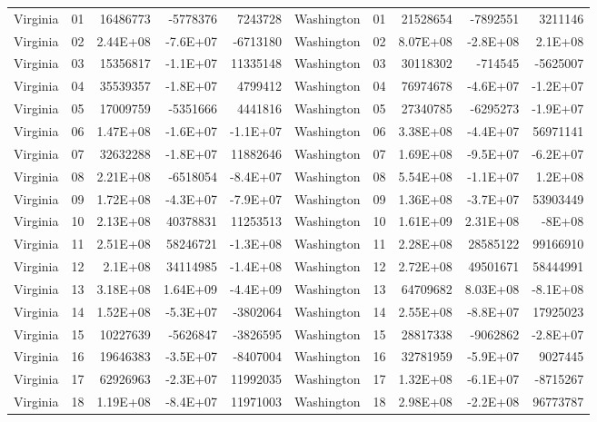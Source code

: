 \begin{landscape}
\begin{singlespace}
\begin{longtable}{lrrrr|lrrrr}
		Virginia &  01  & 16486773 & -5778376 & 7243728 & Washington &  01  & 21528654 & -7892551 & 3211146 \\
		Virginia &  02  & 2.44E+08 & -7.6E+07 & -6713180 & Washington &  02  & 8.07E+08 & -2.8E+08 & 2.1E+08 \\
		Virginia &  03  & 15356817 & -1.1E+07 & 11335148 & Washington &  03  & 30118302 & -714545 & -5625007 \\
		Virginia &  04  & 35539357 & -1.8E+07 & 4799412 & Washington &  04  & 76974678 & -4.6E+07 & -1.2E+07 \\
		Virginia &  05  & 17009759 & -5351666 & 4441816 & Washington &  05  & 27340785 & -6295273 & -1.9E+07 \\
		Virginia &  06  & 1.47E+08 & -1.6E+07 & -1.1E+07 & Washington &  06  & 3.38E+08 & -4.4E+07 & 56971141 \\
		Virginia &  07  & 32632288 & -1.8E+07 & 11882646 & Washington &  07  & 1.69E+08 & -9.5E+07 & -6.2E+07 \\
		Virginia &  08  & 2.21E+08 & -6518054 & -8.4E+07 & Washington &  08  & 5.54E+08 & -1.1E+07 & 1.2E+08 \\
		Virginia &  09  & 1.72E+08 & -4.3E+07 & -7.9E+07 & Washington &  09  & 1.36E+08 & -3.7E+07 & 53903449 \\
		Virginia &  10 & 2.13E+08 & 40378831 & 11253513 & Washington &  10 & 1.61E+09 & 2.31E+08 & -8E+08 \\
		Virginia &  11 & 2.51E+08 & 58246721 & -1.3E+08 & Washington &  11 & 2.28E+08 & 28585122 & 99166910 \\
		Virginia &  12 & 2.1E+08 & 34114985 & -1.4E+08 & Washington &  12 & 2.72E+08 & 49501671 & 58444991 \\
		Virginia &  13 & 3.18E+08 & 1.64E+09 & -4.4E+09 & Washington &  13 & 64709682 & 8.03E+08 & -8.1E+08 \\
		Virginia &  14 & 1.52E+08 & -5.3E+07 & -3802064 & Washington &  14 & 2.55E+08 & -8.8E+07 & 17925023 \\
		Virginia &  15 & 10227639 & -5626847 & -3826595 & Washington &  15 & 28817338 & -9062862 & -2.8E+07 \\
		Virginia &  16 & 19646383 & -3.5E+07 & -8407004 & Washington &  16 & 32781959 & -5.9E+07 & 9027445 \\
		Virginia &  17 & 62926963 & -2.3E+07 & 11992035 & Washington &  17 & 1.32E+08 & -6.1E+07 & -8715267 \\
		Virginia &  18 & 1.19E+08 & -8.4E+07 & 11971003 & Washington &  18 & 2.98E+08 & -2.2E+08 & 96773787 \\

\end{longtable}
\end{singlespace}
\end{landscape}
